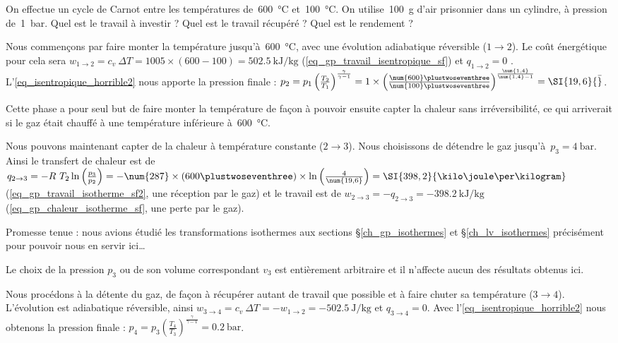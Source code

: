 		\begin{anexample}
		\label{ex_cycle_carnot}
			On effectue un cycle de Carnot entre les températures de~\SI{600}{\degreeCelsius} et~\SI{100}{\degreeCelsius}. On utilise~\SI{100}{\gram} d’air prisonnier dans un cylindre, à pression de~\SI{1}{\bar}. Quel est le travail à investir ? Quel est le travail récupéré ? Quel est le rendement ?
				 \begin{answer}
				 	Nous commençons par faire monter la température jusqu’à~\SI{600}{\degreeCelsius}, avec une évolution adiabatique réversible ($1\to 2$). Le coût énergétique pour cela sera $w_{1\to 2} = c_v \ \Delta T = \num{1005}\times(\num{600}-\num{100}) = \SI{+502,5}{\kilo\joule\per\kilogram}$ (\ref{eq_gp_travail_isentropique_sf}) et $q_{1\to 2} = 0$ . L’\cref{eq_isentropique_horrible2} nous apporte la pression finale : $p_2
				 	= p_1 \left(\frac{T_2}{T_1}\right)^{\frac{\gamma}{\gamma - 1}}
				 	= 1 \times \left(\frac{\num{600}\plustwoseventhree}{\num{100}\plustwoseventhree}\right)^{\frac{\num{1,4}}{\num{1,4} - 1}}
				 	= \SI{19,6}{\bar}$.
				 		\begin{remark}Cette phase a pour seul but de faire monter la température de façon à pouvoir ensuite capter la chaleur sans irréversibilité, ce qui arriverait si le gaz était chauffé à une température inférieure à~\SI{600}{\degreeCelsius}.\end{remark}
					Nous pouvons maintenant capter de la chaleur à température constante ($2 \to 3$). Nous choisissons de détendre le gaz jusqu’à~$p_3 = \SI{4}{\bar}$. Ainsi le transfert de chaleur est de $q_{2 \to 3}
					= - R \ T_2 \ln\left(\frac{p_3}{p_2}\right)
					= - \num{287} \times (600\plustwoseventhree) \times \ln \left(\frac{4}{\num{19,6}}\right)
					= \SI{398,2}{\kilo\joule\per\kilogram}$ (\ref{eq_gp_travail_isotherme_sf2}, une réception par le gaz) et le travail est de $w_{2 \to 3} = - q_{2 \to 3} = \SI{-398,2}{\kilo\joule\per\kilogram}$ (\ref{eq_gp_chaleur_isotherme_sf}, une perte par le gaz).
						\begin{remark}Promesse tenue : nous avions étudié les transformations isothermes aux sections \S\ref{ch_gp_isothermes} et \S\ref{ch_lv_isothermes} précisément pour pouvoir nous en servir ici…\end{remark}
				 		\begin{remark}Le choix de la pression $p_3$ ou de son volume correspondant $v_3$ est entièrement arbitraire et il n’affecte aucun des résultats obtenus ici.\end{remark}
				 	Nous procédons à la détente du gaz, de façon à récupérer autant de travail que possible et à faire chuter sa température ($3 \to 4$). L’évolution est adiabatique réversible, ainsi $w_{3\to 4} = c_v \ \Delta T = -w_{1\to 2} = \SI{-502,5}{\joule\per\kilogram}$ et $q_{3\to 4} = 0$. Avec l’\cref{eq_isentropique_horrible2} nous obtenons la pression finale : $p_4 = p_3 \left(\frac{T_4}{T_3}\right)^{\frac{\gamma}{\gamma - 1}} = \SI{0,2}{\bar}$.

\end{answer}
\end{anexample}
